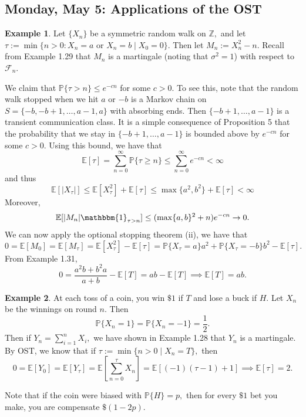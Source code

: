 \documentclass[10pt, oneside]{article}
\newcommand{\bbZ}{\mathbb{Z}}
\newcommand{\bbP}{\mathbb{P}}
\newcommand{\bbE}{\mathbb{E}}
\theoremstyle{definition}
\newtheorem{exmp}{Example}[section]
\begin{document}
\newpage
\subsection*{Monday, May 5: Applications of the OST}
\begin{exmp}
    Let $\{X_n\}$ be a symmetric random walk on $\bbZ,$ and let $\tau := \min\{n >0 : X_n = a \text{ or }X_n = b \mid X_0 = 0\}.$ Then let $M_n := X_n^2 - n.$ Recall from Example 1.29 that $M_n$ is a martingale (noting that $\sigma^2 = 1$) with respect to $\mathcal{F}_n.$ 

    We claim that $\bbP\{\tau > n\} \leq e^{-cn}$ for some $c>0.$ To see this, note that the random walk stopped when we hit $a$ or $-b$ is a Markov chain on $S = \{-b, -b + 1, \dots, a-1, a\}$ with absorbing ends. Then $\{-b + 1, \dots, a-1\}$ is a transient communication class. It is a simple consequence of Proposition 5 that the probability that we stay in $\{-b +1, \dots, a-1\}$ is bounded above by $e^{-cn}$ for some $c>0.$ Using this bound, we have that 
    \[\bbE[\tau] = \sum_{n=0}^\infty \bbP\{\tau \geq n\}\leq \sum_{n=0}^\infty e^{-cn} < \infty\] and thus
    \[\bbE[|X_\tau|] \leq \bbE[X_\tau^2] + \bbE[\tau] \leq \max\{a^2, b^2\} + \bbE[\tau] < \infty\]
    Moreover, 
    \[\bbE[|M_n|\mathbbm{1}_{\tau >n}] \leq (\max\{a,b\}^2 + n)e^{-cn} \to 0. \] We can now apply the optional stopping theorem (ii), we have that 
    \[ 0= \bbE[M_0] = \bbE[M_\tau] = \bbE[X_\tau^2] - \bbE[\tau] = \bbP\{X_\tau = a\}a^2+ \bbP\{X_\tau = -b\}b^2 - \bbE[\tau].\] From Example 1.31,
    \[0 = \frac{a^2 b  + b^2 a}{a + b} - \bbE[T] = ab - \bbE[T] \implies \bbE[T] = ab.\]
\end{exmp}


\begin{exmp}
    At each toss of a coin, you win $\$1$ if $T$ and lose a buck if $H$. Let $X_n$ be the winnings on round $n.$ Then 
    \[\bbP\{X_n = 1\} = \bbP\{X_n= -1\} = \frac{1}{2}.\] Then if $Y_n = \sum_{i=1}^n X_i,$ we have shown in Example 1.28 that $Y_n$ is a martingale. By OST, we know that if $\tau:= \min\{n >0 \mid X_n = T\},$ then
    \[0 = \bbE[Y_0] = \bbE[Y_\tau] = \bbE[\sum_{n=0}^\tau X_n] = \bbE[(-1)(\tau-1) + 1] \implies \bbE[\tau] = 2.\]

    Note that if the coin were biased with $\bbP\{H\} = p,$ then for every $\$1$ bet you make, you are compensate $\$(1 - 2p).$
\end{exmp}
\end{document}
